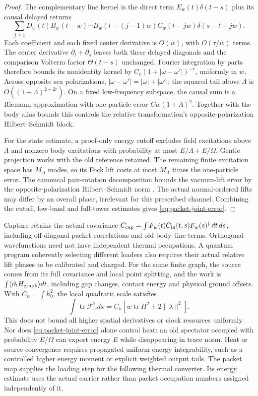 \begin{proof}
The complementary line kernel is the direct term $E_w(t)\delta(t-s)$
plus its causal delayed returns
\[
 \sum_{j\ge1}D_w(t)B_w(t-w)\cdots B_w(t-(j-1)w)
 C_w(t-jw)\delta(s-t+jw).
\]
Each coefficient and each fixed center derivative is $O(w)$,
with $O(\tau/w)$ terms. The center derivative
$\partial_t+\partial_s$ leaves both these delayed diagonals and
the comparison Volterra factor $\Theta(t-s)$ unchanged.
Fourier integration by parts therefore bounds its nonidentity
kernel by $C_r(1+|\omega-\omega'|)^{-r}$, uniformly in $w$.
Across opposite sea polarizations,
$|\omega-\omega'|=|\omega|+|\omega'|$; the squared tail above
$\Lambda$ is $O((1+\Lambda)^{2-2r})$.
On a fixed low-frequency subspace, the causal sum is a Riemann
approximation with one-particle error $Cw(1+\Lambda)^2$.
Together with the body alias bounds this controls the relative
transformation's opposite-polarization Hilbert--Schmidt block.

For the state estimate, a proof-only energy cutoff excludes field
excitations above $\Lambda$ and nonzero body excitations with
probability at most $E/\Lambda+E/\Omega$.
Gentle projection works with the old reference retained.
The remaining finite excitation space has $M_\Lambda$ modes, so
its Fock lift costs at most $M_\Lambda$ times the one-particle error.
The canonical pair-rotation decomposition bounds the vacuum-lift
error by the opposite-polarization Hilbert--Schmidt norm
\cite[Section~7.4, Theorem~31]{Derezinski2005}.
The actual normal-ordered lifts may differ by an overall phase,
irrelevant for this prescribed channel. Combining the cutoff,
low-band and full-tower estimates gives
\eqref{eq:packet-joint-error}.
\end{proof}

Capture retains the actual covariance
$C_{\rm cap}=\int F_w(t)C_{\rm in}(t,s)F_w(s)^\dagger\,dt\,ds$,
including off-diagonal packet correlations and old body--line terms.
Orthogonal wavefunctions need not have independent thermal occupations.
A quantum program coherently selecting different loaders also requires
their actual relative lift phases to be calibrated and charged.
For the same finite graph, the source comes from its full covariance
and local point splitting, and the work is
$\int\langle\partial_tH_{\rm graph}\rangle dt$,
including gap changes, contact energy and physical ground offsets.
With $C_h=\int h_0^2$, the local quadratic scale satisfies
\[
 \int\operatorname{tr}\mathcal F_w^2dx
 =C_h\left[w\operatorname{tr}H^2+2\|\lambda\|^2\right].
\]
This does not bound all higher spatial derivatives or clock resources
uniformly. Nor does \eqref{eq:packet-joint-error} alone control heat:
an old spectator occupied with probability $E/\Omega$ can export
energy $E$ while disappearing in trace norm. Heat or source convergence
requires propagated uniform energy integrability, such as a controlled
higher energy moment or explicit weighted output tails. The packet
map supplies the loading step for the following thermal converter.
Its energy estimate uses the actual carrier rather than packet
occupation numbers assigned independently of it.

